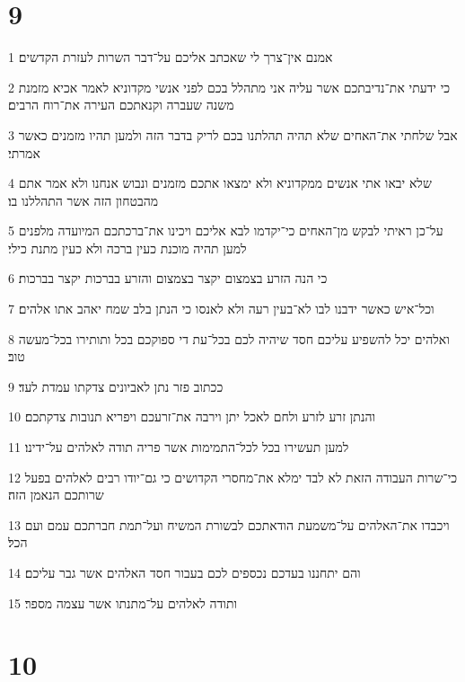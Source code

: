\chapter{9}

\par 1 אמנם אין־צרך לי שאכתב אליכם על־דבר השרות לעזרת הקדשים׃
\par 2 כי ידעתי את־נדיבתכם אשר עליה אני מתהלל בכם לפני אנשי מקדוניא לאמר אכיא מזמנת משנה שעברה וקנאתכם העירה את־רוח הרבים׃
\par 3 אבל שלחתי את־האחים שלא תהיה תהלתנו בכם לריק בדבר הזה ולמען תהיו מזמנים כאשר אמרתי׃
\par 4 שלא יבאו אתי אנשים ממקדוניא ולא ימצאו אתכם מזמנים ונבוש אנחנו ולא אמר אתם מהבטחון הזה אשר התהללנו בו׃
\par 5 על־כן ראיתי לבקש מן־האחים כי־יקדמו לבא אליכם ויכינו את־ברכתכם המיועדה מלפנים למען תהיה מוכנת כעין ברכה ולא כעין מתנת כילי׃
\par 6 כי הנה הזרע בצמצום יקצר בצמצום והזרע בברכות יקצר בברכות׃
\par 7 וכל־איש כאשר ידבנו לבו לא־בעין רעה ולא לאנסו כי הנתן בלב שמח יאהב אתו אלהים׃
\par 8 ואלהים יכל להשפיע עליכם חסד שיהיה לכם בכל־עת די ספוקכם בכל ותותירו בכל־מעשה טוב׃
\par 9 ככתוב פזר נתן לאביונים צדקתו עמדת לעד׃
\par 10 והנתן זרע לזרע ולחם לאכל יתן וירבה את־זרעכם ויפריא תנובות צדקתכם׃
\par 11 למען תעשירו בכל לכל־התמימות אשר פריה תודה לאלהים על־ידינו׃
\par 12 כי־שרות העבודה הזאת לא לבד ימלא את־מחסרי הקדושים כי גם־יודו רבים לאלהים בפעל שרותכם הנאמן הזה׃
\par 13 ויכבדו את־האלהים על־משמעת הודאתכם לבשורת המשיח ועל־תמת חברתכם עמם ועם הכל׃
\par 14 והם יתחננו בעדכם נכספים לכם בעבור חסד האלהים אשר גבר עליכם׃
\par 15 ותודה לאלהים על־מתנתו אשר עצמה מספר׃

\chapter{10}


